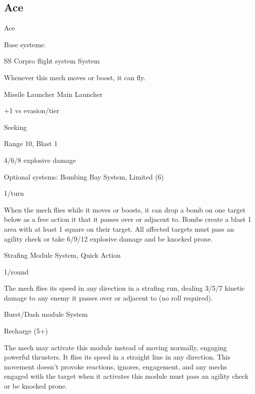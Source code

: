 \subsection{Ace}
\begin{npc}{Ace}




\npcBox
[hull = -1,
agility = +3,
systems = +1,
engineering = +0,
hp = 16,
evasion = 11,
e-defense = 9,
heat cap = 8,
armor = 0,
speed = 6,
sensors = 10,
size = 1/2 or 1]

Base systems:

SS Corpro flight system
System

Whenever this mech moves or boost, it can fly.


Missile Launcher
Main Launcher

+1 vs evasion/tier

Seeking

Range 10, Blast 1

4/6/8 explosive damage


Optional systems:
Bombing Bay
System, Limited (6)

1/turn

When the mech flies while it moves or boosts, it can drop a bomb on one target below as a free
action it that it passes over or adjacent to. Bombs create a blast 1 area with at least 1 square on
their target. All affected targets must pass an agility check or take 6/9/12 explosive damage and
be knocked prone.





Strafing Module
System, Quick Action

1/round

The mech flies its speed in any direction in a strafing run, dealing 3/5/7 kinetic damage to any
enemy it passes over or adjacent to (no roll required).


Burst/Dash module
System

Recharge (5+)

The mech may activate this module instead of moving normally, engaging powerful thrusters. It
flies its speed in a straight line in any direction. This movement doesn’t provoke reactions,
ignores, engagement, and any mechs engaged with the target when it activates this module
must pass an agility check or be knocked prone.



\end{npc}
